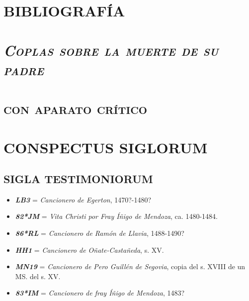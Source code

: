 \documentclass[11pt]{article}
\newcommand{\eg}{{\emph{\textbf{LB3}}}}
\newcommand{\jm}{\emph{\textbf{82*JM}}}
\newcommand{\rl}{\emph{\textbf{86*RL}}}
\newcommand{\hh}{\emph{\textbf{HH1}}}
\newcommand{\mn}{\emph{\textbf{MN19}}}
\newcommand{\im}{\emph{\textbf{83*IM}}}
\begin{document}
\section*{\centering BIBLIOGRAFÍA}
\nocite{*}
\printbibliography[heading=none]
\cleardoublepage
%
\section*{\centering\huge\textsc{\emph{Coplas sobre la muerte de su padre}}}
%
\section*{\centering\textsc{con aparato crítico}}
\newpage
%
\setcounter{page}{12}
\section*{\centering\textsc{CONSPECTUS SIGLORUM}}
%
\subsection*{\normalsize\textsc{SIGLA TESTIMONIORUM}}
\vspace*{-2.5pt}
\begin{itemize}[label=,leftmargin=0.6cm]%
\item {\eg} = \emph{Cancionero de Egerton}, 1470?-1480?
\item {\jm} = \emph{Vita Christi por Fray Íñigo de Mendoza}, ca. 1480-1484.
\item {\rl} = \emph{Cancionero de Ramón de Llavia}, 1488-1490?
\item {\hh} = \emph{Cancionero de Oñate-Castañeda}, s. XV.
\item {\mn} = \emph{Cancionero de Pero Guillén de Segovia}, copia del s. XVIII de un MS. del s. XV.
\item {\im} = \emph{Cancionero de fray Íñigo de Mendoza}, 1483?%
\end{itemize}
%
\end{document}
